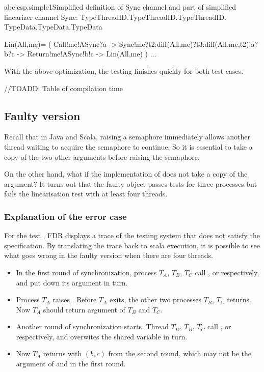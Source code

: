 \documentclass{article}
\begin{document}
\begin{cspinline}{abc.csp.simple1}{Simplified definition of Sync channel and part of simplified linearizer}
channel Sync: TypeThreadID.TypeThreadID.TypeThreadID.
              TypeData.TypeData.TypeData

Lin(All,me)= (
  Call!me!ASync?a ->
  Sync!me?t2:diff(All,{me})?t3:diff(All,{me,t2})!a?b?c ->
  Return!me!ASync!b!c ->
  Lin(All,me)
) ...
\end{cspinline}

With the above optimization, the testing finishes quickly for both test cases.

//TOADD: Table of compilation time

\subsection{Faulty version}
Recall that in Java and Scala, raising a semaphore immediately allows another thread waiting to acquire the semaphore to continue. So it is essential to take a copy of the two other arguments before raising the semaphore.

On the other hand, what if the implementation of  does not take a copy of the argument? It turns out that the faulty  object passes tests for three processes but fails the linearisation test with at least four threads.


\subsubsection{Explanation of the error case}
For the test \CSPM{Spec4Thread [T= System4}, FDR displays a trace of the testing system that does not satisfy the specification. By translating the trace back to scala execution, it is possible to see what goes wrong in the faulty version when there are four threads.

\begin{itemize}
  \item In the first round of synchronization, process $T_A$, $T_B$, $T_C$ call ,  or  respectively, and put down its argument in turn.
  \item Process $T_A$ raises . Before $T_A$ exits, the other two processes $T_B$, $T_C$ returns. Now $T_A$ should return argument of $T_B$ and $T_C$.
  \item Another round of synchronization starts. Thread $T_D$, $T_B$, $T_C$ call ,  or  respectively, and overwites the shared variable  in turn.
  \item Now $T_A$ returns with $(b,c)$ from the second round, which may not be the argument of  and  in the first round.
\end{itemize}
\end{document}
